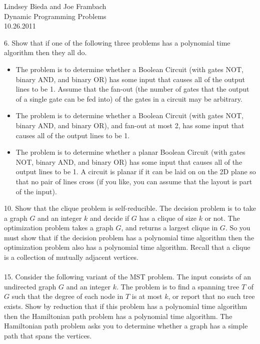 \documentclass[10pt]{article}
\begin{document}
	\begin{flushright}
	Lindsey Bieda and Joe Frambach\\
	Dynamic Programming Problems\\
	10.26.2011
	\end{flushright}
	6.  Show that if one of the following three problems has a polynomial time algorithm then they all do.
	\begin{itemize}
		\item The problem is to determine whether a Boolean Circuit (with gates NOT, binary AND, and
					binary OR) has some input that causes all of the output lines to be 1.  Assume that the fan-out
					(the number of gates that the output of a single gate can be fed into) of the gates in a circuit may
					be arbitrary.
		\item The problem is to determine whether a Boolean Circuit (with gates NOT, binary AND, and
					binary OR), and fan-out at most 2, has some input that causes all of the output lines to be 1.
		\item The problem is to determine whether a planar Boolean Circuit (with gates NOT, binary AND,
					and binary OR) has some input that causes all of the output lines to be 1. A circuit is planar if
					it can be laid on on the 2D plane so that no pair of lines cross (if you like, you can assume that
					the layout is part of the input).
	\end{itemize}
	10.		Show that the clique problem is self-reducible.  The decision problem is to take a graph $G$ and an
				integer $k$ and decide if $G$ has a clique of size $k$ or not. The optimization problem takes a graph $G$, and
				returns a largest clique in $G$.  So you must show that if the decision problem has a polynomial time
				algorithm then the optimization problem also has a polynomial time algorithm. Recall that a clique is
				a collection of mutually adjacent vertices.
	\\
	\\
	15.	Consider the following variant of the MST problem. The input consists of an undirected graph $G$ and
			an integer $k$. The problem is to find a spanning tree $T$ of $G$ such that the degree of each node in $T$ is
			at most $k$, or report that no such tree exists. Show by reduction that if this problem has a polynomial
			time algorithm then the Hamiltonian path problem has a polynomial time algorithm. The Hamiltonian
			path problem asks you to determine whether a graph has a simple path that spans the vertices.
\end{document}
